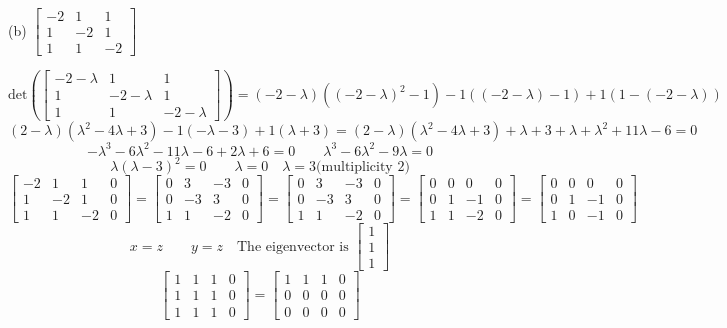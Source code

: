 \documentclass[hidelinks]{article}
\begin{document}
(b) $\begin{bmatrix}-2 & 1 & 1 \\ 1 & -2 & 1 \\ 1 & 1  & -2 \end{bmatrix}$

\[
	\text{det}(\begin{bmatrix}-2 -\lambda & 1 & 1 \\ 1 & -2 -\lambda & 1 \\ 1 & 1  & -2 -\lambda \end{bmatrix}) = (-2-\lambda)((-2-\lambda)^2 - 1) - 1((-2-\lambda) - 1) + 1(1 - (-2-\lambda))
\]
\[
	(2-\lambda)(\lambda^2-4\lambda+3) -1 (-\lambda- 3) + 1(\lambda + 3) = (2-\lambda)(\lambda^2-4\lambda+3) + \lambda + 3 + \lambda + \lambda^2 + 11\lambda - 6 = 0
\]
\[
	-\lambda^3 -6\lambda^2-11\lambda-6+2\lambda + 6 = 0 \quad \quad \lambda^3 - 6\lambda^2-9\lambda = 0
\]
\[
	\lambda(\lambda -3)^2 = 0 \quad \quad \lambda = 0 \quad \lambda = 3 \text{(multiplicity 2)}
\]
\[
	\begin{bmatrix}-2 & 1 & 1 & 0 \\ 1 & -2 & 1 & 0 \\ 1 & 1  & -2 & 0\end{bmatrix} = \begin{bmatrix}0 & 3 & -3 & 0 \\ 0 & -3 & 3 & 0 \\ 1 & 1  & -2 & 0\end{bmatrix} = \begin{bmatrix}0 & 3 & -3 & 0 \\ 0 & -3 & 3 & 0 \\ 1 & 1  & -2 & 0\end{bmatrix}= \begin{bmatrix}0 & 0 & 0 & 0 \\ 0 & 1 & -1 & 0 \\ 1 & 1  & -2 & 0\end{bmatrix} = \begin{bmatrix}0 & 0 & 0 & 0 \\ 0 & 1 & -1 & 0 \\ 1 & 0  & -1 & 0\end{bmatrix}
\]
\[
	x = z \quad \quad y = z \quad \text{The eigenvector is } \begin{bmatrix} 1 \\ 1 \\ 1 \end{bmatrix}
\]
\[
\begin{bmatrix}1 & 1 & 1 & 0 \\ 1 & 1 & 1 & 0 \\ 1 & 1  & 1 & 0\end{bmatrix} = \begin{bmatrix} 1 & 1 & 1 & 0 \\ 0 & 0 & 0 & 0 \\ 0 & 0  & 0 & 0\end{bmatrix} 
\]
\end{document}
